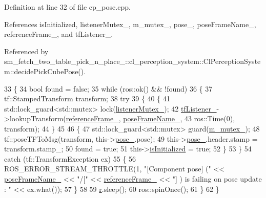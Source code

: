 Definition at line 32 of file cp\+\_\+pose.\+cpp.



References is\+Initialized, listener\+Mutex\+\_\+, m\+\_\+mutex\+\_\+, pose\+\_\+, pose\+Frame\+Name\+\_\+, reference\+Frame\+\_\+, and tf\+Listener\+\_\+.



Referenced by sm\+\_\+fetch\+\_\+two\+\_\+table\+\_\+pick\+\_\+n\+\_\+place\+\_\+::cl\+\_\+perception\+\_\+system\+::\+Cl\+Perception\+System\+::decide\+Pick\+Cube\+Pose().


\begin{DoxyCode}
33     \{
34         \textcolor{keywordtype}{bool} found = \textcolor{keyword}{false};
35         \textcolor{keywordflow}{while} (ros::ok() && !found)
36         \{
37             tf::StampedTransform transform;
38             \textcolor{keywordflow}{try}
39             \{
40                 \{
41                     std::lock\_guard<std::mutex> lock(\hyperlink{classcl__move__base__z_1_1Pose_ae1b5ee53f49d74926e04a477d792f1d0}{listenerMutex\_});
42                     \hyperlink{classcl__move__base__z_1_1Pose_a188a5ac62d5424c1eacd667868049962}{tfListener\_}->lookupTransform(\hyperlink{classcl__move__base__z_1_1Pose_a6a7a593232b6edaf99103d48ad8da9d3}{referenceFrame\_}, 
      \hyperlink{classcl__move__base__z_1_1Pose_a4f45be8e2fd73e618d815582a4ca8efe}{poseFrameName\_},
43                                                       ros::Time(0), transform);
44                 \}
45 
46                 \{
47                     std::lock\_guard<std::mutex> guard(\hyperlink{classcl__move__base__z_1_1Pose_a73ed2daba3e473e156cab751fb37b58f}{m\_mutex\_});
48                     tf::poseTFToMsg(transform, this->\hyperlink{classcl__move__base__z_1_1Pose_a9da7acf880968a3c220b8436fd0bb6ef}{pose\_}.pose);
49                     this->\hyperlink{classcl__move__base__z_1_1Pose_a9da7acf880968a3c220b8436fd0bb6ef}{pose\_}.header.stamp = transform.stamp\_;
50                     found = \textcolor{keyword}{true};
51                     this->\hyperlink{classcl__move__base__z_1_1Pose_a49df3a978021edb71a48ef5e6d8e75a8}{isInitialized} = \textcolor{keyword}{true};
52                 \}
53             \}
54             \textcolor{keywordflow}{catch} (tf::TransformException ex)
55             \{
56                 ROS\_ERROR\_STREAM\_THROTTLE(1, \textcolor{stringliteral}{"[Component pose] ("} << 
      \hyperlink{classcl__move__base__z_1_1Pose_a4f45be8e2fd73e618d815582a4ca8efe}{poseFrameName\_} << \textcolor{stringliteral}{"/["} << \hyperlink{classcl__move__base__z_1_1Pose_a6a7a593232b6edaf99103d48ad8da9d3}{referenceFrame\_} << \textcolor{stringliteral}{"] ) is failing on pose update : 
      "} << ex.what());
57             \}
58 
59             \hyperlink{namespacefake__cube__perception__node_a36e88703ab69fd35065e8a8d9344903e}{r}.sleep();
60             ros::spinOnce();
61         \}
62     \}
\end{DoxyCode}
